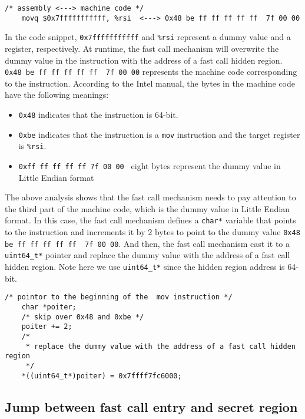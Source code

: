   \begin{lstlisting}[style=CStyle]
    /* assembly <---> machine code */
    movq $0x7fffffffffff, %rsi  <---> 0x48 be ff ff ff ff ff  7f 00 00
  \end{lstlisting}

  In the code snippet, \verb|0x7fffffffffff| and \verb|%rsi| represent a dummy 
  value and a register, respectively. At runtime, the fast call mechanism 
  will overwrite the dummy value in the instruction with the address of a 
  fast call hidden region. \verb|0x48 be ff ff ff ff ff  7f 00 00| represents the 
  machine code corresponding to the instruction. According to the Intel manual, 
  the bytes in the machine code have the following meanings:
  
  \begin{itemize}
    \item \verb|0x48| indicates that the instruction is 64-bit.
    \item \verb|0xbe| indicates that the instruction is a \verb|mov| instruction and the target register is \verb|%rsi|.
    \item \verb|0xff ff ff ff ff 7f 00 00 | eight bytes represent the dummy value in Little Endian format
  \end{itemize}
  
  The above analysis shows that the fast call mechanism needs to pay attention to 
  the third part of the machine code, which is the dummy value in Little Endian 
  format. In this case, the fast call mechanism defines a \verb|char*| variable that 
  points to the instruction and increments it by 2 bytes to point to the 
  dummy value \verb|0x48 be ff ff ff ff ff  7f 00 00|. And then, the fast call mechanism cast it to a \verb|uint64_t*|
  pointer and replace the dummy value with the address of a fast call hidden 
  region. Note here we use \verb|uint64_t*| since the hidden region address is 64-bit.

  \begin{lstlisting}[style=CStyle]
    /* pointor to the beginning of the  mov instruction */ 
    char *poiter;
    /* skip over 0x48 and 0xbe */ 
    poiter += 2; 
    /* 
     * replace the dummy value with the address of a fast call hidden region 
     */  
    *((uint64_t*)poiter) = 0x7ffff7fc6000; 
  \end{lstlisting}


\subsection{Jump between fast call entry and secret region}

